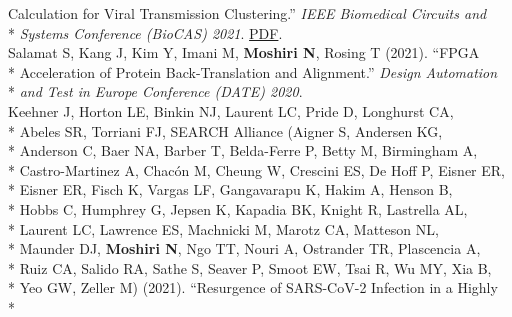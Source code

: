 \documentclass[margin,line]{res}
\begin{document}
\begin{resume}
\hspace*{9mm} Calculation for Viral Transmission Clustering.'' \textit{IEEE Biomedical Circuits and}\\*\vspace{2mm}
\hspace*{8mm} \textit{Systems Conference (BioCAS) 2021}. \href{https://par.nsf.gov/servlets/purl/10323850}{PDF}.\\
\hspace*{4mm} Salamat S, Kang J, Kim Y, Imani M, \textbf{Moshiri N}, Rosing T (2021). ``FPGA\\*
\hspace*{9mm} Acceleration of Protein Back-Translation and Alignment.'' \textit{Design Automation}\\*\vspace{2mm}
\hspace*{8mm} \textit{and Test in Europe Conference (DATE) 2020}.\\
\hspace*{4mm} Keehner J, Horton LE, Binkin NJ, Laurent LC, Pride D, Longhurst CA,\\*
\hspace*{9mm} Abeles SR, Torriani FJ, SEARCH Alliance (Aigner S, Andersen KG,\\*
\hspace*{9mm} Anderson C, Baer NA, Barber T, Belda-Ferre P, Betty M, Birmingham A,\\*
\hspace*{9mm} Castro-Martinez A, Chac\'on M, Cheung W, Crescini ES, De Hoff P, Eisner ER,\\*
\hspace*{9mm} Eisner ER, Fisch K, Vargas LF, Gangavarapu K, Hakim A, Henson B,\\*
\hspace*{9mm} Hobbs C, Humphrey G, Jepsen K, Kapadia BK, Knight R, Lastrella AL,\\*
\hspace*{9mm} Laurent LC, Lawrence ES, Machnicki M, Marotz CA, Matteson NL,\\*
\hspace*{9mm} Maunder DJ, \textbf{Moshiri N}, Ngo TT, Nouri A, Ostrander TR, Plascencia A,\\*
\hspace*{9mm} Ruiz CA, Salido RA, Sathe S, Seaver P, Smoot EW, Tsai R, Wu MY, Xia B,\\*
\hspace*{9mm} Yeo GW, Zeller M) (2021). ``Resurgence of SARS-CoV-2 Infection in a Highly\\*

\end{resume}
\end{document}
